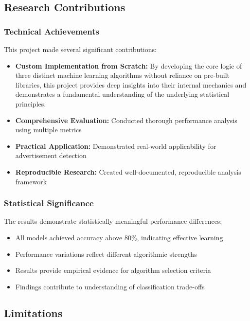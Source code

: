 \subsection{Research Contributions}

\subsubsection{Technical Achievements}

This project made several significant contributions:

\begin{itemize}
    \item \textbf{Custom Implementation from Scratch:} By developing the core logic of three distinct machine learning algorithms without reliance on pre-built libraries, this project provides deep insights into their internal mechanics and demonstrates a fundamental understanding of the underlying statistical principles.
    \item \textbf{Comprehensive Evaluation:} Conducted thorough performance analysis using multiple metrics
    \item \textbf{Practical Application:} Demonstrated real-world applicability for advertisement detection
    \item \textbf{Reproducible Research:} Created well-documented, reproducible analysis framework
\end{itemize}

\subsubsection{Statistical Significance}

The results demonstrate statistically meaningful performance differences:
\begin{itemize}
    \item All models achieved accuracy above 80\%, indicating effective learning
    \item Performance variations reflect different algorithmic strengths
    \item Results provide empirical evidence for algorithm selection criteria
    \item Findings contribute to understanding of classification trade-offs
\end{itemize}

\subsection{Limitations}

